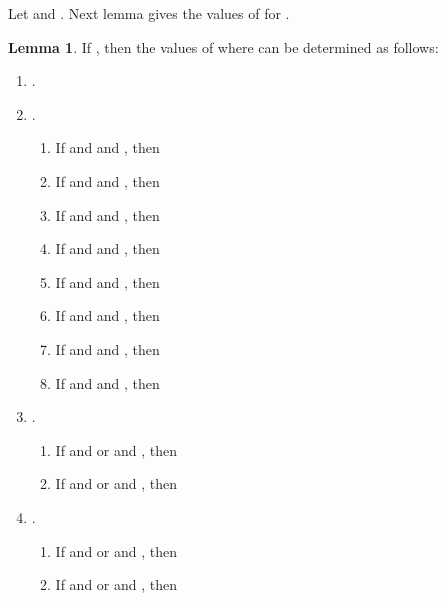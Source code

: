 \documentclass{mcom-l}
\theoremstyle{definition}
\newtheorem{sec3lemma8}[sec3lemma1]{Lemma}
\numberwithin{equation}{section}
\begin{document}
     Let  and . Next lemma gives the values of  for .
     \begin{sec3lemma8}\label{lab_sec3_lemma8}
     If , then the values of  where  can be determined as follows:
     \begin{enumerate} \item .
     
     \item .
     \begin{enumerate}
     \item If  and  and , then
     
     \item If  and  and , then
     
     \item If  and  and , then
     
     \item If  and  and , then
     
     \item If  and  and , then
     
     \item If  and  and , then
     
     \item If  and  and , then
     
     \item If  and  and , then
     
     \end{enumerate}
     \item .
     \begin{enumerate}
     \item
     If  and  or  and , then
     
     \item
     If  and  or  and , then
     
     \end{enumerate}
     \item .
     \begin{enumerate}
     \item
     If  and  or  and , then
     
     \item
     If  and  or  and , then
     
     \end{enumerate}
     \end{enumerate}
     \end{sec3lemma8}
\end{document}
